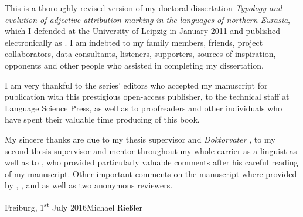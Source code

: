 

This is a thoroughly revised version of my doctoral dissertation \textit{Typology and evolution of adjective attribution marking in the languages of northern Eurasia}, which I defended at the University of Leipzig in January 2011 and published electronically as \citet{riesler2011a}. I am indebted to my family members, friends, project collaborators, data consultants, listeners, supporters, sources of inspiration, opponents and other people who assisted in completing my dissertation. 

I am very thankful to the series’ editors who accepted my manuscript for publication with this prestigious open-access publisher, to the technical staff at Language Science Press, as well as to proofreaders and other individuals who have spent their valuable time producing of this book. 

My sincere thanks are due to my thesis supervisor and \emph{Doktorvater} , to my second thesis supervisor and mentor throughout my whole carrier as a linguist  as well as to , who provided particularly valuable comments after his careful reading of my manuscript. Other important comments on the manuscript where provided by , ,  and  as well as two anonymous reviewers.

\bigskip

\noindent
Freiburg, 1\textsuperscript{st} July 2016\hfill Michael Rießler
